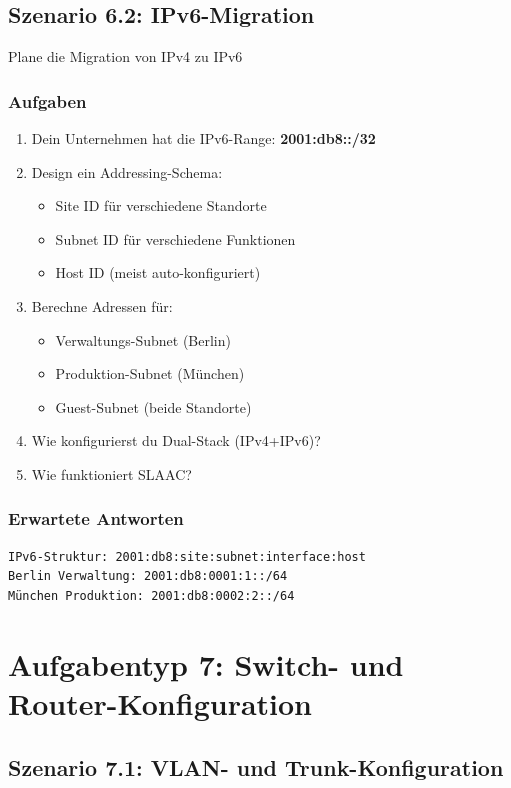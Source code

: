\documentclass[12pt,a4paper,german]{report}
\begin{document}
\section{Szenario 6.2: IPv6-Migration}

Plane die Migration von IPv4 zu IPv6

\subsection{Aufgaben}
\begin{enumerate}
    \item Dein Unternehmen hat die IPv6-Range: \textbf{2001:db8::/32}
    \item Design ein Addressing-Schema:
    \begin{itemize}
        \item Site ID für verschiedene Standorte
        \item Subnet ID für verschiedene Funktionen
        \item Host ID (meist auto-konfiguriert)
    \end{itemize}
    \item Berechne Adressen für:
    \begin{itemize}
        \item Verwaltungs-Subnet (Berlin)
        \item Produktion-Subnet (München)
        \item Guest-Subnet (beide Standorte)
    \end{itemize}
    \item Wie konfigurierst du Dual-Stack (IPv4+IPv6)?
    \item Wie funktioniert SLAAC?
\end{enumerate}

\subsection{Erwartete Antworten}
\begin{lstlisting}
IPv6-Struktur: 2001:db8:site:subnet:interface:host
Berlin Verwaltung: 2001:db8:0001:1::/64
München Produktion: 2001:db8:0002:2::/64
\end{lstlisting}

\chapter{Aufgabentyp 7: Switch- und Router-Konfiguration}

\section{Szenario 7.1: VLAN- und Trunk-Konfiguration}
\end{document}
